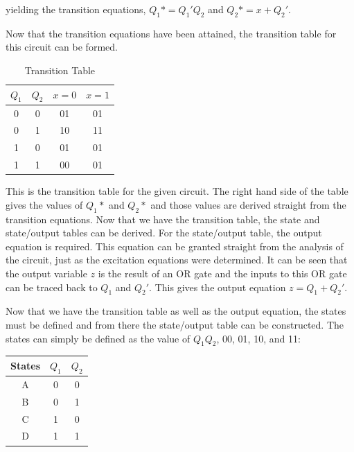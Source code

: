 \documentclass[12pt]{article}
\begin{document}
    yielding the transition equations, $Q_1* = Q_1' Q_2$ and $Q_2* = x + Q_2'$.
    \par Now that the transition equations have been attained, the transition
    table for this circuit can be formed.
    \begin{table}[h]
        \centering
        \begin{tabular}{cc|cc}
            \toprule
            $Q_1$ & $Q_2$ & $x=0$ & $x=1$ \\
            \midrule
            0 & 0 & 01 & 01 \\
            0 & 1 & 10 & 11 \\
            1 & 0 & 01 & 01 \\
            1 & 1 & 00 & 01 \\
            \bottomrule
        \end{tabular}
        \caption{Transition Table}
    \end{table}
    \par This is the transition table for the given circuit. The right hand side
    of the table gives the values of $Q_1*$ and $Q_2*$ and those values are
    derived straight from the transition equations. Now that we have the
    transition table, the state and state/output tables can be derived. For the
    state/output table, the output equation is required. This equation can be
    granted straight from the analysis of the circuit, just as the excitation
    equations were determined. It can be seen that the output variable $z$ is
    the result of an OR gate and the inputs to this OR gate can be traced back
    to $Q_1$ and $Q_2'$. This gives the output equation $z = Q_1 + Q_2'$.
    \par Now that we have the transition table as well as the output equation,
    the states must be defined and from there the state/output table can be
    constructed. The states can simply be defined as the value of $Q_1 Q_2$, 00,
    01, 10, and 11:
    \begin{table}[h]
        \centering
        \begin{tabular}{c|cc}
            States & $Q_1$ & $Q_2$ \\
            \midrule
            A & 0 & 0 \\
            B & 0 & 1 \\
            C & 1 & 0 \\
            D & 1 & 1 \\
        \end{tabular}
    \end{table}
\end{document}
